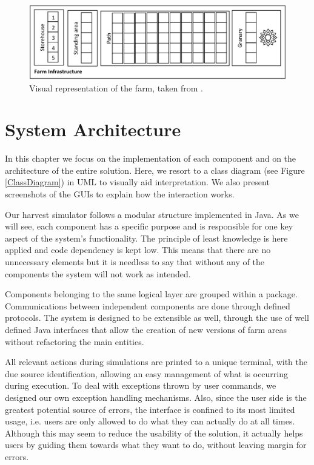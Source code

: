 \documentclass[12pt]{article}
\begin{document}
\begin{figure}[H]
  \centering
  \begin{minipage}{\textwidth}
    \centering
    \includegraphics[width=\linewidth]{img/Design_FI.png}
  \end{minipage}%
  \caption{Visual representation of the farm, taken from \cite{assign}.}
  \label{Design_FI}
\end{figure} 

\newpage
\section{System Architecture} %

In this chapter we focus on the implementation of each component and on the architecture of the entire solution.
Here, we resort to a class diagram (see Figure \ref{ClassDiagram}) in UML \cite{uml} to visually aid interpretation.
We also present screenshots of the GUIs to explain how the interaction works.

Our harvest simulator follows a modular structure implemented in Java.
As we will see, each component has a specific purpose and is responsible for one key aspect of the system's functionality.
The principle of least knowledge is here applied and code dependency is kept low.
This means that there are no unnecessary elements but it is needless to say that without any of the components the system will not work as intended.

Components belonging to the same logical layer are grouped within a package.
Communications between independent components are done through defined protocols. 
The system is designed to be extensible as well, through the use of well defined Java interfaces that allow the creation of new versions of farm areas without 
refactoring the main entities.

All relevant actions during simulations are printed to a unique terminal, with the due source identification, allowing an easy management of what is occurring 
during execution.
To deal with exceptions thrown by user commands, we designed our own exception handling mechanisms.
Also, since the user side is the greatest potential source of errors, the interface is confined to its most limited usage, i.e. users are only allowed to do 
what they can actually do at all times.
Although this may seem to reduce the usability of the solution, it actually helps users by guiding them towards what they want to do, without leaving margin for errors.
\end{document}
